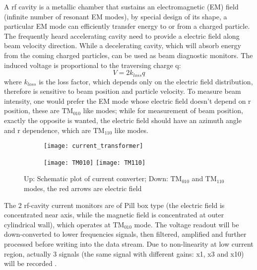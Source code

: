 A rf cavity is a metallic chamber that sustains an electromagnetic (EM) field 
(infinite number of resonant EM modes), by special design of its shape, a particular
EM mode can efficiently transfer energy to or from a charged particle. The 
frequently heard accelerating cavity need to provide a electric field along
beam velocity direction. While a decelerating cavity, which will absorb energy
from the coming charged particles, can be used as beam diagnostic monitors.
The induced voltage is proportional to the traversing charge q:
\begin{equation}
    V = 2k_{loss} q
\end{equation}
where $k_{loss}$ is the loss factor, which depends only on the electric field
distribution, therefore is sensitive to beam position and particle velocity.
To measure beam intensity, one would prefer the EM mode whose electric field
doesn't depend on r position, these are $\text{TM}_{\text{010}}$ like modes;
while for measurement of beam position, exactly the opposite is wanted, the
electric field should have an azimuth angle and r dependence, which are $\text{TM}_{\text{110}}$
like modes.
\begin{figure}
    \centering
    \begin{subfigure}[c]{0.5\textwidth}
	\texttt{[image: current\_transformer]}
    \end{subfigure}
    \begin{subfigure}[c]{0.55\textwidth}
	\texttt{[image: TM010]}
	\texttt{[image: TM110]}
    \end{subfigure}
    \caption{Up: Schematic plot of current converter; 
    Down: $\text{TM}_\text{010}$ and $\text{TM}_\text{110}$ modes, the red arrows are electric field}
\end{figure}

The 2 rf-cavity current monitors are of Pill box type (the electric field is
concentrated near axis, while the magnetic field is concentrated at outer
cylindrical wall), which operates at $\text{TM}_\text{010}$ mode. The voltage 
readout will be down-converted to lower frequencies signals, then filtered, 
amplified and further processed before writing into the data stream. Due to
non-linearity at low current region, actually 3 signals (the same signal with
different gains: x1, x3 and x10) will be recorded \cite{hall_A_equip_manual}.

